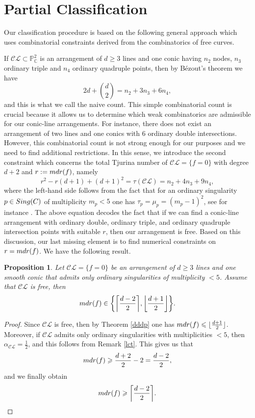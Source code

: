 \documentclass[12pt]{article}
\theoremstyle{plain}
\newtheorem{proposition}[thm]{Proposition}
\theoremstyle{definition}
\renewcommand\geq{\geqslant}
\renewcommand\leq{\leqslant}
\begin{document}
\section{Partial Classification}
Our classification procedure is based on the following general approach which uses combinatorial constraints derived from the combinatorics of free curves.

If $\mathcal{CL} \subset \mathbb{P}^{2}_{\mathbb{C}}$ is an arrangement of $d\geq 3$ lines and one conic having $n_{2}$ nodes, $n_{3}$ ordinary triple and $n_{4}$ ordinary quadruple points, then by B\'ezout's theorem we have
\begin{equation}
    2d + \binom{d}{2} = n_{2} + 3n_{3} + 6n_{4},
\end{equation}
and this is what we call the naive count. This simple combinatorial count is crucial because it allows us to determine which weak combinatorics are admissible for our conic-line arrangements. For instance, there does not exist an arrangement of two lines and one conics with $6$ ordinary double intersections. However, this combinatorial count is not strong enough for our purposes and we need to find additional restrictions. In this sense, we introduce the second constraint which concerns the total Tjurina number of $\mathcal{CL} = \{f=0\}$ with degree $d+2$ and $r:={\rm mdr}(f)$, namely
\begin{equation}
r^{2} - r(d+1) + (d+1)^2 = \tau(\mathcal{CL}) = n_{2} + 4n_{3} + 9n_{4},
\end{equation}
where the left-hand side follows from the fact that for an ordinary singularity $p \in {\rm Sing}(C)$ of multiplicity $m_{p} < 5$ one has $\tau_{p} = \mu_{p} = (m_{p}-1)^2$, see for instance \cite[Section 2]{KP}. The above equation decodes the fact that if we can find a conic-line arrangement with ordinary double, ordinary triple, and ordinary quadruple intersection points with suitable $r$, then our arrangement is free. Based on this discussion, our last missing element is to find numerical constraints on $r={\rm mdr}(f)$.
We have the following result.
\begin{proposition}
Let $\mathcal{CL} = \{f=0\}$ be an arrangement of $d\geq 3$ lines and one smooth conic that admits only ordinary singularities of multiplicity $<5$. Assume that $\mathcal{CL}$ is free, then
$${\rm mdr}(f) \in \bigg\{\bigg\lceil \frac{d-2}{2} \bigg\rceil, \bigg\lfloor \frac{d+1}{2} \bigg \rfloor \bigg\}.$$
\end{proposition}
\begin{proof}
Since $\mathcal{CL}$ is free, then by Theorem \ref{dddp} one has ${\rm mdr}(f) \leq \lfloor \frac{d+1}{2} \rfloor$. Moreover, if $\mathcal{CL}$ admits only ordinary singularities with multiplicities $<5$, then $\alpha_{\mathcal{CL}} = \frac{1}{2}$, and this follows from Remark \ref{lct}. This gives us that
$${\rm mdr}(f) \geq \frac{d+2}{2} - 2 = \frac{d-2}{2},$$
and we finally obtain
$${\rm mdr}(f)\geq \bigg\lceil \frac{d-2}{2} \bigg\rceil.$$
\end{proof}
\end{document}
